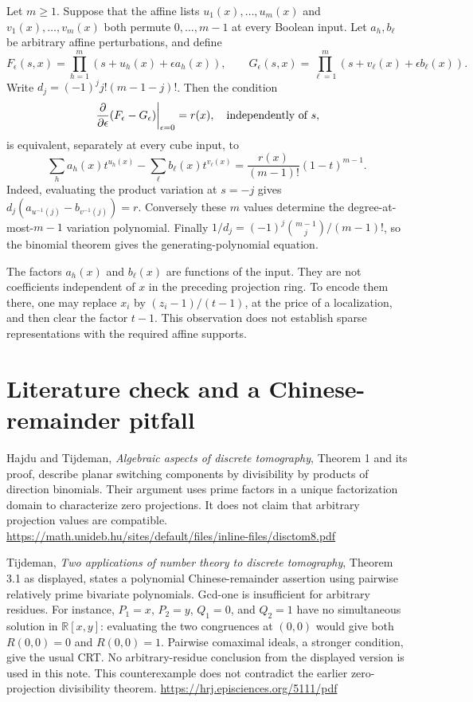\documentclass[11pt]{article}
\begin{document}
Let $m\geq1$. Suppose that the affine lists
$u_1(x),\ldots,u_m(x)$ and $v_1(x),\ldots,v_m(x)$ both permute
$0,\ldots,m-1$ at every Boolean input. Let $a_h,b_\ell$ be
arbitrary affine perturbations, and define
\[
 F_\epsilon(s,x)=\prod_{h=1}^m(s+u_h(x)+\epsilon a_h(x)),\qquad
 G_\epsilon(s,x)=\prod_{\ell=1}^m(s+v_\ell(x)+\epsilon b_\ell(x)).
\]
Write $d_j=(-1)^j j!(m-1-j)!$. Then the condition
\[
 \left.\frac{\partial}{\partial\epsilon}
        (F_\epsilon-G_\epsilon)\right|_{\epsilon=0}=r(x),
 \quad\hbox{independently of }s,
\]
is equivalent, separately at every cube input, to
\[
 \sum_h a_h(x)t^{u_h(x)}-\sum_\ell b_\ell(x)t^{v_\ell(x)}
       =\frac{r(x)}{(m-1)!}(1-t)^{m-1}.
\]
Indeed, evaluating the product variation at $s=-j$ gives
$d_j(a_{u^{-1}(j)}-b_{v^{-1}(j)})=r$. Conversely these $m$
values determine the degree-at-most-$m-1$ variation polynomial.
Finally $1/d_j=(-1)^j\binom{m-1}{j}/(m-1)!$, so the binomial
theorem gives the generating-polynomial equation.

The factors $a_h(x)$ and $b_\ell(x)$ are functions of the input.
They are not coefficients independent of $x$ in the preceding
projection ring. To encode them there, one may replace $x_i$ by
$(z_i-1)/(t-1)$, at the price of a localization, and then clear
the factor $t-1$. This observation does not establish sparse
representations with the required affine supports.

\section{Literature check and a Chinese-remainder pitfall}

Hajdu and Tijdeman, \emph{Algebraic aspects of discrete tomography},
Theorem 1 and its proof, describe planar switching components by
divisibility by products of direction binomials. Their argument uses
prime factors in a unique factorization domain to characterize zero
projections. It does not claim that arbitrary projection values are
compatible.
\url{https://math.unideb.hu/sites/default/files/inline-files/disctom8.pdf}

Tijdeman, \emph{Two applications of number theory to discrete tomography},
Theorem 3.1 as displayed, states a polynomial Chinese-remainder
assertion using pairwise relatively prime bivariate polynomials.
Gcd-one is insufficient for arbitrary residues. For instance,
$P_1=x$, $P_2=y$, $Q_1=0$, and $Q_2=1$ have no simultaneous
solution in $\mathbb R[x,y]$: evaluating the two congruences at
$(0,0)$ would give both $R(0,0)=0$ and $R(0,0)=1$.
Pairwise comaximal ideals, a stronger condition, give the usual CRT.
No arbitrary-residue conclusion from the displayed version is used
in this note. This counterexample does not contradict the earlier
zero-projection divisibility theorem.
\url{https://hrj.episciences.org/5111/pdf}
\end{document}
